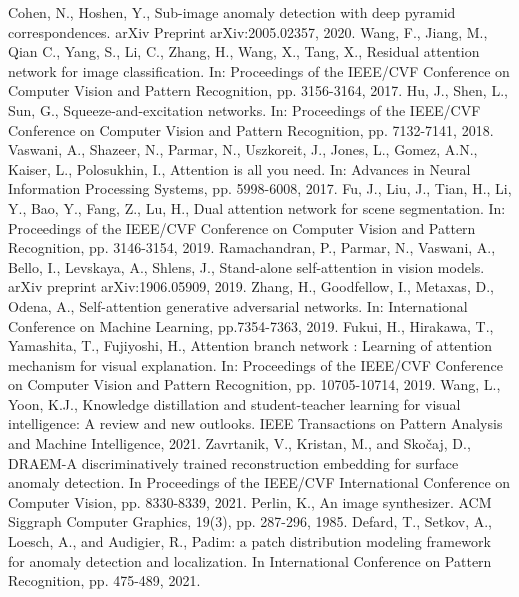 \documentclass[letterpaper, 10 pt, conference]{ieeeconf}
\begin{document}
\begin{thebibliography}{99}
 Cohen, N., Hoshen, Y., Sub-image anomaly detection with deep pyramid correspondences. arXiv Preprint arXiv:2005.02357, 2020.
 Wang, F., Jiang, M., Qian C., Yang, S., Li, C., Zhang, H., Wang, X., Tang, X., Residual attention network for image classification. In: Proceedings of the IEEE/CVF Conference on Computer Vision and Pattern Recognition, pp. 3156-3164, 2017.
 Hu, J., Shen, L., Sun, G., Squeeze-and-excitation networks. In: Proceedings of the IEEE/CVF Conference on Computer Vision and Pattern Recognition, pp. 7132-7141, 2018.
 Vaswani, A., Shazeer, N., Parmar, N., Uszkoreit, J., Jones, L., Gomez, A.N., Kaiser, L., Polosukhin, I., Attention is all you need. In: Advances in Neural Information Processing Systems, pp. 5998-6008, 2017.
 Fu, J., Liu, J., Tian, H., Li, Y., Bao, Y., Fang, Z., Lu, H., Dual attention network for scene segmentation. In: Proceedings of the IEEE/CVF Conference on Computer Vision and Pattern Recognition, pp. 3146-3154, 2019.
 Ramachandran, P., Parmar, N., Vaswani, A., Bello, I., Levskaya, A., Shlens, J., Stand-alone self-attention in vision models. arXiv preprint arXiv:1906.05909, 2019.
 Zhang, H., Goodfellow, I., Metaxas, D., Odena, A., Self-attention generative adversarial networks. In: International Conference on Machine Learning, pp.7354-7363, 2019.
 Fukui, H., Hirakawa, T., Yamashita, T., Fujiyoshi, H., Attention branch network : Learning of attention mechanism for visual explanation. In: Proceedings of the IEEE/CVF Conference on Computer Vision and Pattern Recognition, pp. 10705-10714, 2019.
 Wang, L., Yoon, K.J., Knowledge distillation and student-teacher learning for visual intelligence: A review and new outlooks. IEEE Transactions on Pattern Analysis and Machine Intelligence, 2021.
 Zavrtanik, V., Kristan, M., and Skočaj, D., DRAEM-A discriminatively trained reconstruction embedding for surface anomaly detection. In Proceedings of the IEEE/CVF International Conference on Computer Vision, pp. 8330-8339, 2021.
 Perlin, K., An image synthesizer. ACM Siggraph Computer Graphics, 19(3), pp. 287-296, 1985.
 Defard, T., Setkov, A., Loesch, A., and Audigier, R., Padim: a patch distribution modeling framework for anomaly detection and localization. In International Conference on Pattern Recognition, pp. 475-489, 2021.

\end{thebibliography}
\end{document}
